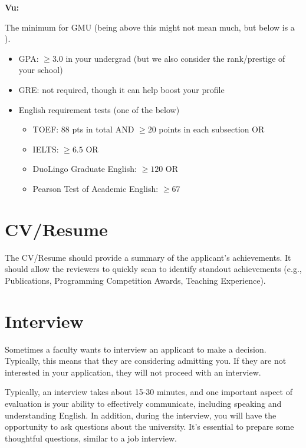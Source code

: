 \documentclass[oneside,11pt]{memoir}
\newenvironment{commentbox}[1][]{
\small
    \begin{mybox}
    {\small \textbf{#1}}
 }{
   \end{mybox}
}
\newcommand{\red}[1]{{\color{red}{#1}}}
\begin{document}
\begin{commentbox}[Vu:]
The minimum for GMU (being above this might not mean much, but below is a \red{red flag}).
\begin{itemize}
\item GPA: $\ge 3.0$ in your undergrad (but we also consider the rank/prestige of your school)
\item GRE: not required, though it can help boost your profile
\item English requirement tests (one of the below)
  \begin{itemize}    
  \item TOEF: 88 pts in total AND $\ge 20$ points in each subsection OR
  \item IELTS: $\ge 6.5$ OR
  \item DuoLingo Graduate English: $\ge 120$ OR 
  \item Pearson Test of Academic English: $\ge 67$
  \end{itemize}  
\end{itemize}
\end{commentbox}


\section{CV/Resume}
The CV/Resume should provide a summary of the applicant's achievements.  It should allow the reviewers to quickly scan to identify standout achievements (e.g., Publications, Programming Competition Awards, Teaching Experience).

\section{Interview}
Sometimes a faculty wants to interview an applicant to make a decision. Typically, this means that they are considering admitting you. If they are not interested in your application, they will not proceed with an interview. 

Typically, an interview takes about 15-30 minutes, and one important aspect of evaluation is your ability to effectively communicate, including speaking and understanding English. In addition, during the interview, you will have the opportunity to ask questions about the university. It's essential to prepare some thoughtful questions, similar to a job interview.
\end{document}

